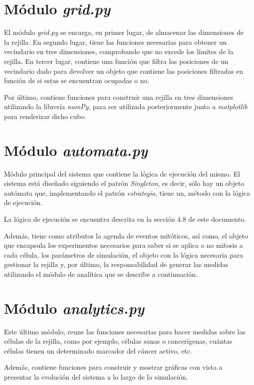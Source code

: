 \section{Módulo \textit{grid.py}}

El módulo \textit{grid.py} se encarga, en primer lugar, de almacenar las dimensiones de la
rejilla. En segundo lugar, tiene las funciones necesarias para obtener un vecindario en
tres dimensiones, comprobando que no excede los límites de la rejilla. En tercer lugar, contiene
una función que filtra las posiciones de un vecindario dado para devolver un objeto que contiene
las posiciones filtradas en función de si estas se encuentran ocupadas o no.

Por último, contiene funciones para construir una rejilla en tres dimensiones utilizando
la librería \textit{numPy}, para ser utilizada posteriormente junto a \textit{matplotlib}
para renderizar dicho cubo.

\section{Módulo \textit{automata.py}}

Módulo principal del sistema que contiene la lógica de ejecución del mismo. El sistema
está diseñado siguiendo el patrón \textit{Singleton}, es decir, sólo hay un objeto
autómata que, implementando el patrón \textit{estrategia}, tiene un, método con
la lógica de ejecución.

La lógica de ejecución se encuentra descrita en la sección 4.8 de este documento.

Además, tiene como atributos la agenda de eventos mitóticos, así como, el objeto que
encapsula los experimentos necesarios para saber si se aplica o no mitosis a cada célula, los
parámetros de simulación, el objeto con la lógica necesaria para gestionar la rejilla y, por último,
la responsabilidad de generar las medidas utilizando el módulo de analítica que se describe a continuación.

\section{Módulo \textit{analytics.py}}

Este último módulo, reune las funciones necesarias para hacer medidas sobre las células
de la rejilla, como por ejemplo, células sanas o cancerígenas, cuántas células tienen un
determinado marcador del cáncer activo, etc.

Además, contiene funciones para construir y mostrar gráficas con vista a presentar la evolución
del sistema a lo largo de la simulación.
